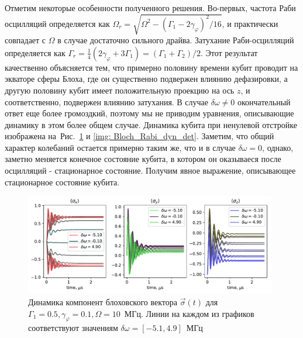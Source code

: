 Отметим некоторые особенности полученного решения. Во-первых, частота Раби осцилляций определяется как $\Omega_r = \sqrt{\Omega^2-(\Gamma_1-2\gamma_\varphi)^2/16}$, и практически совпадает с $\Omega$ в случае достаточно сильного драйва. Затухание Раби-осцилляций определяется как $\Gamma_r = \frac{1}{4}\left(2 \gamma _{\varphi }+3 \Gamma _1\right) = \left(\Gamma_1 + \Gamma_2\right)/2$. Этот результат качественно объясняется тем, что примерно половину времени кубит проводит на экваторе сферы Блоха, где он существенно подвержен влиянию дефазировки, а другую половину кубит имеет положительную проекцию на ось $z$, и соответственно, подвержен влиянию затухания.
В случае $\delta\omega \ne 0$ окончательный ответ еще более громоздкий, поэтому мы не приводим уравнения, описывающие динамику в этом более общем случае. Динамика кубита при ненулевой отстройке изображена на~Рис.~\ref{img: Rabi_dyn_det} и \ref{img: Bloch_Rabi_dyn_det}. Заметим, что общий характер колебаний остается примерно таким же, что и в случае $\delta\omega=0$, однако, заметно меняется конечное состояние кубита, в котором он оказываеся после осцилляций - стационарное состояние. Получим явное выражение, описывающее стационарное состояние кубита.
\begin{figure}[t]
	\includegraphics[width=0.98\textwidth]{images/Rabi_det_2.pdf}
	\caption[Динамика состояния кубита под действием внешнего поля: случай ненулевой отстройки]{Динамика компонент блоховского вектора $\vec{\sigma}(t)$ для $\Gamma_1=0.5, \gamma_\varphi=0.1, \Omega = 10$~МГц. Линии на каждом из графиков соответствуют значениям $\delta\omega=[-5.1,4.9]$~МГц }
	\label{img: Rabi_dyn_det}
\end{figure}
